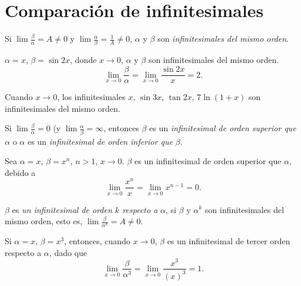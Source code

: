 



\section{Comparación de infinitesimales}

\begin{definition}
 Si \( \lim \frac {\beta} {\alpha} = A \ne 0\) y \( \lim \frac {\alpha} {\beta} = \frac {1} {A} \ne 0 \), \( \alpha \) y \( \beta \) son \emph{infinitesimales del mismo orden}.
\end{definition}


\begin{example}
  \( \alpha = x \), \( \beta = \sin 2x \), donde \( x \to 0 \), \( \alpha \) y \( \beta \) son infinitesimales del mismo orden.
  \[
  \lim_{x \to 0} \frac{\beta}{\alpha} = \lim_{x \to 0} \frac{\sin 2x}{x} = 2.
  \]
\end{example}


\begin{example}
  Cuando \( x \to 0 \), los infinitesimales \( x \), \( \sin 3x \), \( \tan 2x \), \( 7 \ln (1 + x) \) son infinitesimales del mismo orden.
\end{example}


\begin{definition}
  Si \( \lim \frac{\beta}{\alpha} = 0 \) (y \( \lim \frac{\alpha}{\beta} = \infty \), entonces \( \beta \) es un \emph{infinitesimal de orden superior que} \( \alpha \) o \( \alpha \) es un \emph{infinitesimal de orden inferior que} \( \beta \).
\end{definition}


\begin{example}
  Sea \( \alpha = x \), \( \beta = x^n \), \( n > 1 \), \( x \to 0 \). \( \beta \) es un infinitesimal de orden superior que \( \alpha \), debido a
  \[
  \lim_{x \to 0} \frac{x^n}{x} = \lim_{x \to 0} x^{n - 1} = 0.
  \]
\end{example}


\begin{definition}
  \( \beta \) es \emph{un infinitesimal de orden \( k \) respecto a} \( \alpha \), si \( \beta \) y \( \alpha^k \) son infinitesimales del mismo orden, esto es, \( \lim \frac{\beta}{\alpha^k} = A \ne 0 \).
\end{definition}


\begin{example}
  Si \( \alpha = x \), \( \beta = x^3 \), entonces, cuando \( x \to 0 \), \( \beta \) es un infinitesimal de tercer orden respecto a \( \alpha \), dado que
  \[
  \lim_{x \to 0} \frac{\beta}{\alpha^3} = \lim_{x \to 0} \frac{x^3}{(x)^3} = 1.
  \]
\end{example}


